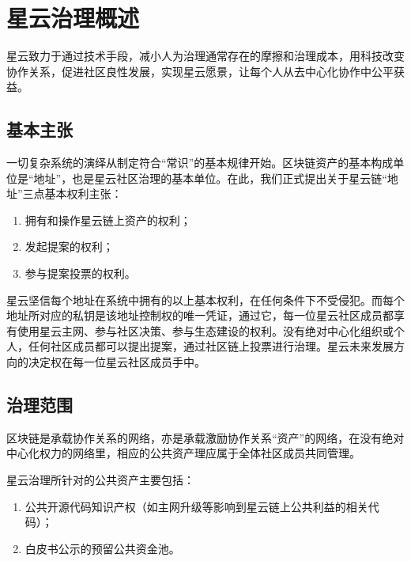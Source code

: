 \section{星云治理概述}
星云致力于通过技术手段，减小人为治理通常存在的摩擦和治理成本，用科技改变协作关系，促进社区良性发展，实现星云愿景，让每个人从去中心化协作中公平获益。

\subsection{基本主张}
一切复杂系统的演绎从制定符合“常识”的基本规律开始。区块链资产的基本构成单位是“地址”，也是星云社区治理的基本单位。在此，我们正式提出关于星云链“地址”三点基本权利主张：
\begin{enumerate}
	\item 拥有和操作星云链上资产的权利；
	\item 发起提案的权利；
	\item 参与提案投票的权利。
\end{enumerate}
星云坚信每个地址在系统中拥有的以上基本权利，在任何条件下不受侵犯。而每个地址所对应的私钥是该地址控制权的唯一凭证，通过它，每一位星云社区成员都享有使用星云主网、参与社区决策、参与生态建设的权利。没有绝对中心化组织或个人，任何社区成员都可以提出提案，通过社区链上投票进行治理。星云未来发展方向的决定权在每一位星云社区成员手中。

\subsection{治理范围}
区块链是承载协作关系的网络，亦是承载激励协作关系“资产”的网络，在没有绝对中心化权力的网络里，相应的公共资产理应属于全体社区成员共同管理。

星云治理所针对的公共资产主要包括：
\begin{enumerate}
	\item 公共开源代码知识产权（如主网升级等影响到星云链上公共利益的相关代码）；
	\item 白皮书公示的预留公共资金池。
\end{enumerate}

